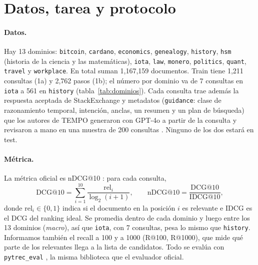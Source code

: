 \documentclass[11pt,a4paper]{article}
\begin{document}
\section{Datos, tarea y protocolo}
\label{sec:protocolo}

\paragraph{Datos.} Hay 13 dominios: \texttt{bitcoin}, \texttt{cardano}, \texttt{economics}, \texttt{genealogy}, \texttt{history}, \texttt{hsm} (historia de la ciencia y las matemáticas), \texttt{iota}, \texttt{law}, \texttt{monero}, \texttt{politics}, \texttt{quant}, \texttt{travel} y \texttt{workplace}. En total suman 1,167,159 documentos. Train tiene 1,211 consultas (1a) y 2,762 pasos (1b); el número por dominio va de 7 consultas en \texttt{iota} a 561 en \texttt{history} (tabla~\ref{tab:dominios}). Cada consulta trae además la respuesta aceptada de StackExchange y metadatos (\texttt{guidance}: clase de razonamiento temporal, intención, anclas, un resumen y un plan de búsqueda) que los autores de TEMPO generaron con GPT-4o \citep{openai2024gpt4o} a partir de la consulta y revisaron a mano en una muestra de 200 consultas \citep{abdallah2026tempo}. Ninguno de los dos estará en test.

\paragraph{Métrica.} La métrica oficial es nDCG@10 \citep{jarvelin2002cumulated}: para cada consulta,
\begin{equation}
\mathrm{DCG@10} = \sum_{i=1}^{10} \frac{\mathrm{rel}_i}{\log_2(i+1)}, \qquad
\mathrm{nDCG@10} = \frac{\mathrm{DCG@10}}{\mathrm{IDCG@10}},
\end{equation}
donde $\mathrm{rel}_i \in \{0,1\}$ indica si el documento en la posición $i$ es relevante e IDCG es el DCG del ranking ideal. Se promedia dentro de cada dominio y luego entre los 13 dominios (\emph{macro}), así que \texttt{iota}, con 7 consultas, pesa lo mismo que \texttt{history}. Informamos también el recall a 100 y a 1000 (R@100, R@1000), que mide qué parte de los relevantes llega a la lista de candidatos. Todo se evalúa con \texttt{pytrec\_eval} \citep{vangysel2018pytreceval}, la misma biblioteca que el evaluador oficial.
\end{document}
